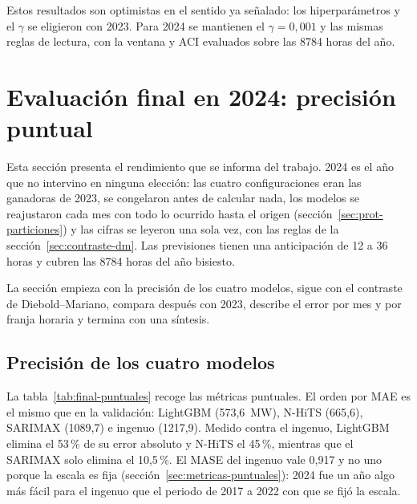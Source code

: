 Estos resultados son optimistas en el sentido ya señalado: los hiperparámetros y
el $\gamma$ se eligieron con 2023. Para 2024 se mantienen el
$\gamma = 0{,}001$ y las mismas reglas de lectura, con la ventana y ACI
evaluados sobre las 8784 horas del año.

\section{Evaluación final en 2024: precisión puntual}\label{sec:evaluacion-final}

Esta sección presenta el rendimiento que se informa del trabajo. 2024 es el
año que no intervino en ninguna elección: las cuatro configuraciones eran las
ganadoras de 2023, se congelaron antes de calcular nada, los modelos se
reajustaron cada mes con todo lo ocurrido hasta el origen
(sección~\ref{sec:prot-particiones}) y las cifras se leyeron una sola vez, con las
reglas de la sección~\ref{sec:contraste-dm}. Las previsiones tienen una
anticipación de 12 a 36 horas y cubren las 8784 horas del año bisiesto.

La sección empieza con la precisión de los cuatro modelos, sigue con el
contraste de Diebold--Mariano, compara después con 2023, describe el error por
mes y por franja horaria y termina con una síntesis.

\subsection{Precisión de los cuatro modelos}\label{sec:final-precision}

La tabla~\ref{tab:final-puntuales} recoge las métricas puntuales. El orden por
MAE es el mismo que en la validación: LightGBM (573,6~MW), N-HiTS (665,6),
SARIMAX (1089,7) e ingenuo (1217,9). Medido contra el ingenuo, LightGBM
elimina el 53\,\% de su error absoluto y N-HiTS el 45\,\%, mientras que el
SARIMAX solo elimina el 10,5\,\%. El MASE del ingenuo vale 0,917 y no uno
porque la escala es fija (sección~\ref{sec:metricas-puntuales}): 2024 fue un año
algo más fácil para el ingenuo que el periodo de 2017 a 2022 con que se fijó
la escala.

